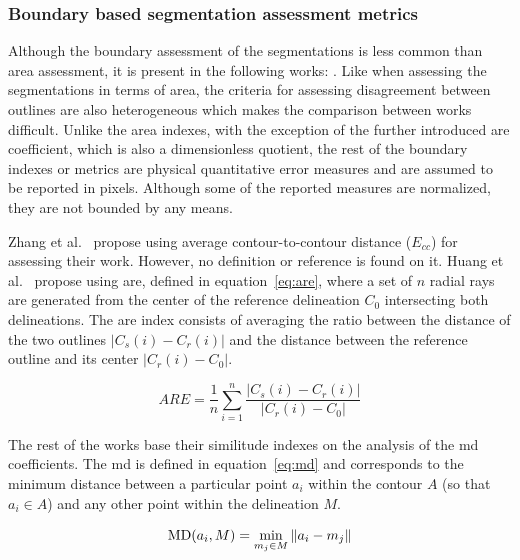 \documentclass[authoryear,preprint,review,12pt]{elsarticle}
\begin{document}
\subsubsection{Boundary based segmentation assessment metrics}

Although the boundary assessment of the segmentations is less common than area assessment, it is present in the following works: \cite{AlemanFlores:2007p14310,Gomez:2010p14339,Gao:2012p14336,Madabhushi:2003p6036,
Shan:2012p14347,Zhang:2010p14317,Huang:2012p14313}. Like when assessing the segmentations in terms of area, the criteria for assessing disagreement between outlines are also heterogeneous which makes the comparison between works difficult. 
Unlike the area indexes, with the exception of the further introduced \ac{are} coefficient, which is also a dimensionless quotient, the rest of the boundary indexes or metrics are physical quantitative error measures and are assumed to be reported in pixels. Although some of the reported measures are normalized, they are not bounded by any means.

Zhang et al.~\cite{Zhang:2010p14317} propose using average contour-to-contour distance ($E_{cc}$) for assessing their work. However, no definition or reference is found on it. Huang et al.~\cite{Huang:2012p14313} propose using \ac{are}, defined in equation~\ref{eq:are}, where a set of $n$ radial rays are generated from the center of the reference delineation $C_0$ intersecting both delineations. The \ac{are} index consists of averaging the ratio between the distance of the two outlines $|C_s(i)-C_r(i)|$ and the distance between the reference outline and its center $|C_r(i)-C_0|$.

\begin{equation}\label{eq:are}
ARE = \frac{1}{n}\sum_{i=1}^{n} \frac{|C_s(i)-C_r(i)|}{|C_r(i)-C_0|}
\end{equation}

The rest of the works base their similitude indexes on the analysis of the \ac{md} coefficients. The \ac{md} is defined in equation~\ref{eq:md} and corresponds to the minimum distance between a particular point $a_i$ within the contour $A$ (so that $a_i \in A$) and any other point within the delineation $M$. 

\begin{equation}
\text{MD}(a_i,M) =\min_{m_j \in M}\Arrowvert a_i - m_j \Arrowvert 
\label{eq:md}
\end{equation}
\end{document}
